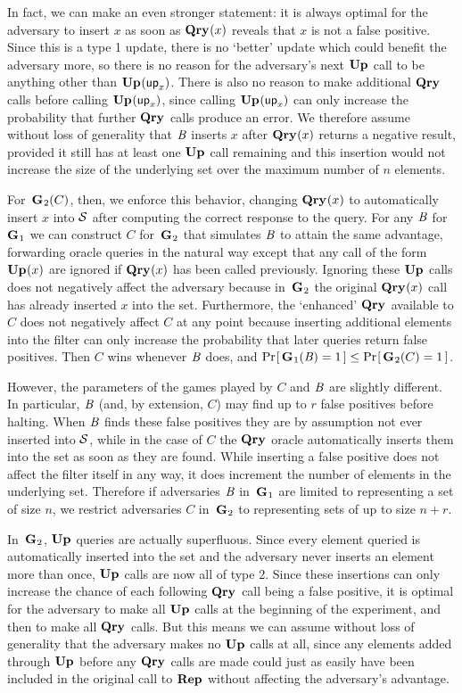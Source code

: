 In fact, we can make an even stronger statement: it is always optimal for the adversary to insert $x$ as soon as $\textup{\textbf{Qry}}\hspace{0.5pt}(x)$ reveals that $x$ is not a false positive. Since this is a type 1 update, there is no `better' update which could benefit the adversary more, so there is no reason for the adversary's next $\textup{\textbf{Up}}\hspace{0.5pt}$ call to be anything other than $\textup{\textbf{Up}}\hspace{0.5pt}(\mathsf{up}_x)$. There is also no reason to make additional $\textup{\textbf{Qry}}\hspace{0.5pt}$ calls before calling $\textup{\textbf{Up}}\hspace{0.5pt}(\mathsf{up}_x)$, since calling $\textup{\textbf{Up}}\hspace{0.5pt}(\mathsf{up}_x)$ can only increase the probability that further $\textup{\textbf{Qry}}\hspace{0.5pt}$ calls produce an error. We therefore assume without loss of generality that $\mathit{B}$ inserts $x$ after $\textup{\textbf{Qry}}\hspace{0.5pt}(x)$ returns a negative result, provided it still has at least one $\textup{\textbf{Up}}\hspace{0.5pt}$ call remaining and this insertion would not increase the size of the underlying set over the maximum number of $n$ elements.

For~$\textup{\textbf{G}}\hspace{0.5pt}_2(C)$, then, we enforce this behavior, changing $\textup{\textbf{Qry}}\hspace{0.5pt}(x)$ to automatically insert $x$ into $\mathcal{S}$ after computing the correct response to the query. For any $\mathit{B}$ for~$\textup{\textbf{G}}\hspace{0.5pt}_1$ we can construct $C$ for~$\textup{\textbf{G}}\hspace{0.5pt}_2$ that simulates $\mathit{B}$ to attain the same advantage, forwarding oracle queries in the natural way except that any call of the form $\textup{\textbf{Up}}\hspace{0.5pt}(x)$ are ignored if $\textup{\textbf{Qry}}\hspace{0.5pt}(x)$ has been called previously. Ignoring these $\textup{\textbf{Up}}\hspace{0.5pt}$ calls does not negatively affect the adversary because in~$\textup{\textbf{G}}\hspace{0.5pt}_2$ the original $\textup{\textbf{Qry}}\hspace{0.5pt}(x)$ call has already inserted $x$ into the set. Furthermore, the `enhanced' $\textup{\textbf{Qry}}\hspace{0.5pt}$ available to $C$ does not negatively affect $C$ at any point because inserting additional elements into the filter can only increase the probability that later queries return false positives. Then $C$ wins whenever $\mathit{B}$ does, and $\Pr\hspace{-1pt}\left[\,\textup{\textbf{G}}\hspace{0.5pt}_1(\mathit{B}) = 1\,\right] \le \Pr\hspace{-1pt}\left[\,\textup{\textbf{G}}\hspace{0.5pt}_2(C) = 1\,\right]$.

However, the parameters of the games played by $C$ and $\mathit{B}$ are slightly different. In particular, $\mathit{B}$ (and, by extension, $C$) may find up to $r$ false positives before halting. When $\mathit{B}$ finds these false positives they are by assumption not ever inserted into $\mathcal{S}$, while in the case of $C$ the $\textup{\textbf{Qry}}\hspace{0.5pt}$ oracle automatically inserts them into the set as soon as they are found. While inserting a false positive does not affect the filter itself in any way, it does increment the number of elements in the underlying set. Therefore if adversaries $\mathit{B}$ in~$\textup{\textbf{G}}\hspace{0.5pt}_1$ are limited to representing a set of size $n$, we restrict adversaries $C$ in~$\textup{\textbf{G}}\hspace{0.5pt}_2$ to representing sets of up to size $n+r$.

In~$\textup{\textbf{G}}\hspace{0.5pt}_2$, $\textup{\textbf{Up}}\hspace{0.5pt}$ queries are actually superfluous. Since every element queried is automatically inserted into the set and the adversary never inserts an element more than once, $\textup{\textbf{Up}}\hspace{0.5pt}$ calls are now all of type 2. Since these insertions can only increase the chance of each following $\textup{\textbf{Qry}}\hspace{0.5pt}$ call being a false positive, it is optimal for the adversary to make all $\textup{\textbf{Up}}\hspace{0.5pt}$ calls at the beginning of the experiment, and then to make all $\textup{\textbf{Qry}}\hspace{0.5pt}$ calls. But this means we can assume without loss of generality that the adversary makes no $\textup{\textbf{Up}}\hspace{0.5pt}$ calls at all, since any elements added through $\textup{\textbf{Up}}\hspace{0.5pt}$ before any $\textup{\textbf{Qry}}\hspace{0.5pt}$ calls are made could just as easily have been included in the original call to $\textup{\textbf{Rep}}\hspace{0.5pt}$ without affecting the adversary's advantage.

